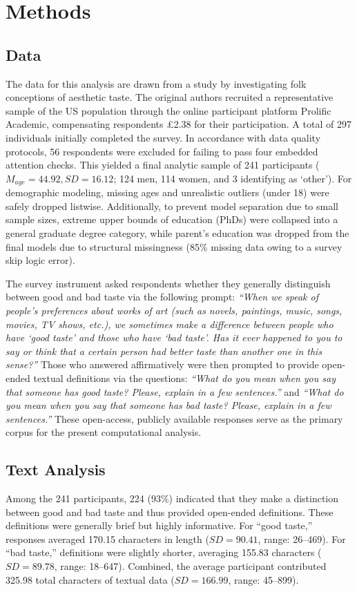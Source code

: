 \documentclass[12pt,letterpaper]{article}
\begin{document}
\section{Methods}

\subsection{Data}
The data for this analysis are drawn from a study by \citet{bonard2024} investigating folk conceptions of aesthetic taste. The original authors recruited a representative sample of the US population through the online participant platform Prolific Academic, compensating respondents \pounds 2.38 for their participation. A total of 297 individuals initially completed the survey. In accordance with data quality protocols, 56 respondents were excluded for failing to pass four embedded attention checks. This yielded a final analytic sample of 241 participants ($M_{age} = 44.92, SD = 16.12$; 124 men, 114 women, and 3 identifying as `other'). For demographic modeling, missing ages and unrealistic outliers (under 18) were safely dropped listwise. Additionally, to prevent model separation due to small sample sizes, extreme upper bounds of education (PhDs) were collapsed into a general graduate degree category, while parent's education was dropped from the final models due to structural missingness (85\% missing data owing to a survey skip logic error).

The survey instrument asked respondents whether they generally distinguish between good and bad taste via the following prompt: \textit{``When we speak of people’s preferences about works of art (such as novels, paintings, music, songs, movies, TV shows, etc.), we sometimes make a difference between people who have `good taste' and those who have `bad taste'. Has it ever happened to you to say or think that a certain person had better taste than another one in this sense?''} Those who answered affirmatively were then prompted to provide open-ended textual definitions via the questions: \textit{``What do you mean when you say that someone has good taste? Please, explain in a few sentences.''} and \textit{``What do you mean when you say that someone has bad taste? Please, explain in a few sentences.''} These open-access, publicly available responses serve as the primary corpus for the present computational analysis.

\subsection{Text Analysis}
Among the 241 participants, 224 (93\%) indicated that they make a distinction between good and bad taste and thus provided open-ended definitions. These definitions were generally brief but highly informative. For ``good taste,'' responses averaged 170.15 characters in length ($SD = 90.41$, range: 26--469). For ``bad taste,'' definitions were slightly shorter, averaging 155.83 characters ($SD = 89.78$, range: 18--647). Combined, the average participant contributed 325.98 total characters of textual data ($SD = 166.99$, range: 45--899). 
\end{document}
